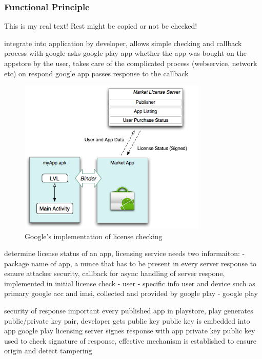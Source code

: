 \subsubsection{Functional Principle} \label{section:license-google-functional}
This is my real text! Rest might be copied or not be checked!

%
integrate into application by developer, allows simple checking and callback process with google
asks google play app whether the app was bought on the appstore by the user, takes care of the complicated process (webservice, network etc)
on respond google app passes response to the callback
\begin{figure}[h]
    \centering
    \includegraphics[width=0.8\textwidth]{data/lvl.png}
    \caption{Google's implementation of license checking \cite{developersLicensingOverview}}
    \label{fig:lvl}
\end{figure}

determine license status of an app, licensing service needs two informaiton:
- package name of app, a nunce that has to be present in every server response to esnure attacker security, callback for async handling of server respone, implemented in initial license check - user
- specific info user and device such as primary google acc and imsi, collected and provided by google play - google play

security of response important
every published app in playstore, play generates public/private key pair, developer gets public key
public key is embedded into app
google play licensing server signes response with app private key
public key used to check signature of response, effective mechanism is established to ensure origin and detect tampering
\cite{munteanLicense}
%

